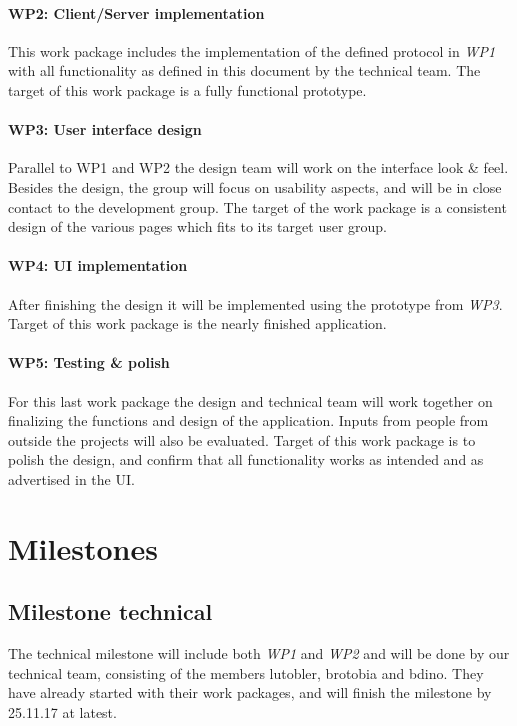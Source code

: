 \documentclass{report}
\begin{document}
\paragraph{WP2: Client/Server implementation}
This work package includes the implementation of the defined protocol in \emph{WP1}
with all functionality as defined in this document by the technical team. The target of this 
work package is a fully functional prototype.

\paragraph{WP3: User interface design}
Parallel to WP1 and WP2 the design team will work on the interface look \& feel. 
Besides the design, the group will focus on usability aspects, and will be in close
contact to the development group. The target of the work package is a consistent 
design of the various pages which fits to its target user group.

\paragraph{WP4: UI implementation}
After finishing the design it will be implemented using the prototype from \emph{WP3}.
Target of this work package is the nearly finished application.

\paragraph{WP5: Testing \& polish}
For this last work package the design and technical team will work together
on finalizing the functions and design of the application. Inputs from people from outside 
the projects will also be evaluated. Target of this work package is to polish the design,
and confirm that all functionality works as intended and as advertised in the UI.

\section{Milestones}

\subsection{Milestone technical}
The technical milestone will include both \emph{WP1} and \emph{WP2} and will be done by our technical team,
consisting of the members lutobler, brotobia and bdino.
They have already started with their work packages, and will finish the milestone by 25.11.17 at latest.
\end{document}
